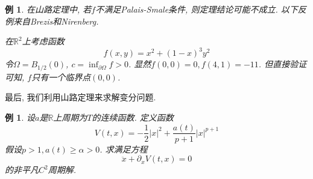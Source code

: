 \documentclass[12pt,a4paper]{article}
\newtheorem{example}[theorem]{例}
\begin{document}
\begin{example}
    在山路定理中, 若$f$不满足Palais-Smale条件, 则定理结论可能不成立. 以下反例来自Brezis和Nirenberg.
    
    在$\mathbb{R}^2$上考虑函数 
    \begin{equation*}
        f(x, y) = x^2 + (1 - x)^3y^2
    \end{equation*}
    令$\Omega = B_{1/2}(0)$, $c = \inf_{\partial\Omega}f > 0$. 显然$f(0, 0) = 0, f(4, 1) = -11$.
    但直接验证可知, $f$只有一个临界点$(0, 0)$.
\end{example}

最后, 我们利用山路定理来求解变分问题.

\begin{example}
    设$a$是$\mathbb{R}$上周期为$T$的连续函数. 定义函数 
    \begin{equation*}
        V(t, x) = -\frac{1}{2}|x|^2 + \frac{a(t)}{p + 1}|x|^{p + 1}
    \end{equation*}
    假设$p > 1, a(t) \geq \alpha > 0$. 求满足方程 
    \begin{equation}\label{58}
        \ddot x + \partial_xV(t, x) = 0
    \end{equation}
    的非平凡$C^2$周期解.


\end{example}
\end{document}
